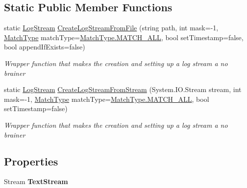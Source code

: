 \subsection*{Static Public Member Functions}
\begin{DoxyCompactItemize}
\item 
static \mbox{\hyperlink{class_a_d_l_1_1_log_stream}{Log\+Stream}} \mbox{\hyperlink{class_a_d_l_1_1_log_stream_a5369ad1bfec52a786117832f74454054}{Create\+Log\+Stream\+From\+File}} (string path, int mask=-\/1, \mbox{\hyperlink{namespace_a_d_l_af6334296dbae0383a652317263f0bc05}{Match\+Type}} match\+Type=\mbox{\hyperlink{namespace_a_d_l_af6334296dbae0383a652317263f0bc05a627c7991c5d0265194247e92fcf120b0}{Match\+Type.\+M\+A\+T\+C\+H\+\_\+\+A\+LL}}, bool set\+Timestamp=false, bool append\+If\+Exists=false)
\begin{DoxyCompactList}\small\item\em Wrapper function that makes the creation and setting up a log stream a no brainer \end{DoxyCompactList}\item 
static \mbox{\hyperlink{class_a_d_l_1_1_log_stream}{Log\+Stream}} \mbox{\hyperlink{class_a_d_l_1_1_log_stream_a2bdd5573b2877b6b1d93d336b8592489}{Create\+Log\+Stream\+From\+Stream}} (System.\+I\+O.\+Stream stream, int mask=-\/1, \mbox{\hyperlink{namespace_a_d_l_af6334296dbae0383a652317263f0bc05}{Match\+Type}} match\+Type=\mbox{\hyperlink{namespace_a_d_l_af6334296dbae0383a652317263f0bc05a627c7991c5d0265194247e92fcf120b0}{Match\+Type.\+M\+A\+T\+C\+H\+\_\+\+A\+LL}}, bool set\+Timestamp=false)
\begin{DoxyCompactList}\small\item\em Wrapper function that makes the creation and setting up a log stream a no brainer \end{DoxyCompactList}\end{DoxyCompactItemize}
\subsection*{Properties}
\begin{DoxyCompactItemize}
\item 
\mbox{\label{class_a_d_l_1_1_log_stream_a65680991404e699fcafd4bc729504fc3}} 
Stream {\bfseries Text\+Stream}
\end{DoxyCompactItemize}


